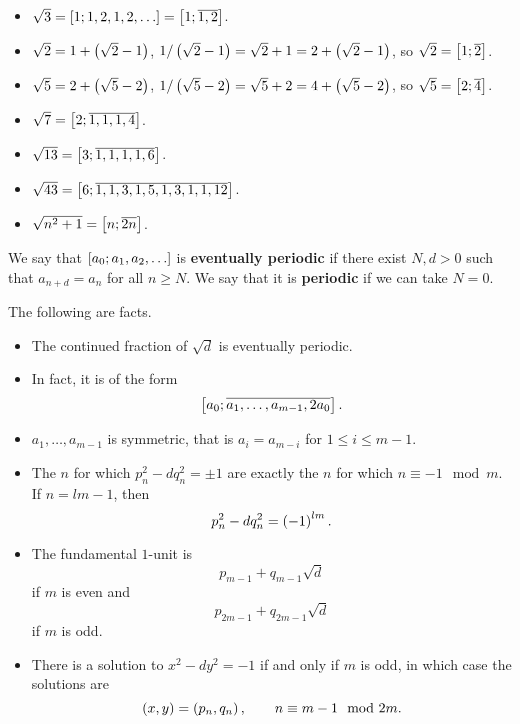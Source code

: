 \begin{example*}
\hfill
\begin{itemize}
\item $ \sqrt{3} = \sb{1; 1, 2, 1, 2, \dots} = \sb{1; \overline{1, 2}} $.
\item $ \sqrt{2} = 1 + \rb{\sqrt{2} - 1} $, $ 1 / \rb{\sqrt{2} - 1} = \sqrt{2} + 1 = 2 + \rb{\sqrt{2} - 1} $, so $ \sqrt{2} = \sb{1; \overline{2}} $.
\item $ \sqrt{5} = 2 + \rb{\sqrt{5} - 2} $, $ 1 / \rb{\sqrt{5} - 2} = \sqrt{5} + 2 = 4 + \rb{\sqrt{5} - 2} $, so $ \sqrt{5} = \sb{2; \overline{4}} $.
\item $ \sqrt{7} = \sb{2; \overline{1, 1, 1, 4}} $.
\item $ \sqrt{13} = \sb{3; \overline{1, 1, 1, 1, 6}} $.
\item $ \sqrt{43} = \sb{6; \overline{1, 1, 3, 1, 5, 1, 3, 1, 1, 12}} $.
\item $ \sqrt{n^2 + 1} = \sb{n; \overline{2n}} $.
\end{itemize}
\end{example*}

\begin{definition}
We say that $ \sb{a_0; a_1, a_2, \dots} $ is \textbf{eventually periodic} if there exist $ N, d > 0 $ such that $ a_{n + d} = a_n $ for all $ n \ge N $. We say that it is \textbf{periodic} if we can take $ N = 0 $.
\end{definition}

\begin{remark}
The following are facts.
\begin{itemize}
\item The continued fraction of $ \sqrt{d} $ is eventually periodic.
\item In fact, it is of the form
$$ \sb{a_0; \overline{a_1, \dots, a_{m - 1}, 2a_0}}. $$
\item $ a_1, \dots, a_{m - 1} $ is symmetric, that is $ a_i = a_{m - i} $ for $ 1 \le i \le m - 1 $.
\item The $ n $ for which $ p_n^2 - dq_n^2 = \pm 1 $ are exactly the $ n $ for which $ n \equiv -1 \mod m $. If $ n = lm - 1 $, then
$$ p_n^2 - dq_n^2 = \rb{-1}^{lm}. $$
\item The fundamental $ 1 $-unit is
$$ p_{m - 1} + q_{m - 1}\sqrt{d} $$
if $ m $ is even and
$$ p_{2m - 1} + q_{2m - 1}\sqrt{d} $$
if $ m $ is odd.
\item There is a solution to $ x^2 - dy^2 = -1 $ if and only if $ m $ is odd, in which case the solutions are
$$ \rb{x, y} = \rb{p_n, q_n}, \qquad n \equiv m - 1 \mod 2m. $$
\end{itemize}
\end{remark}

